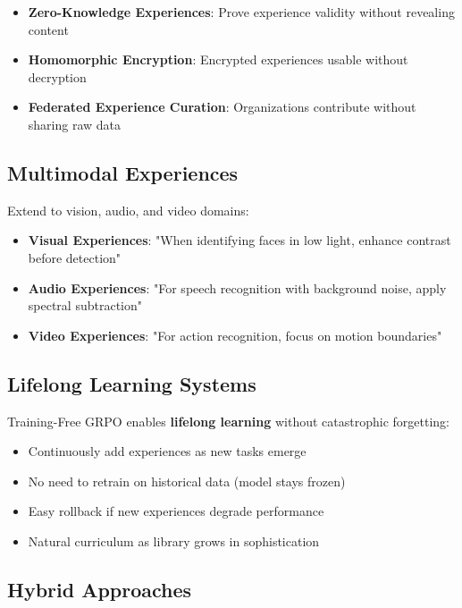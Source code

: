 \begin{itemize}
    \item \textbf{Zero-Knowledge Experiences}: Prove experience validity without revealing content
    \item \textbf{Homomorphic Encryption}: Encrypted experiences usable without decryption
    \item \textbf{Federated Experience Curation}: Organizations contribute without sharing raw data
\end{itemize}

\subsection{Multimodal Experiences}

Extend to vision, audio, and video domains:

\begin{itemize}
    \item \textbf{Visual Experiences}: "When identifying faces in low light, enhance contrast before detection"
    \item \textbf{Audio Experiences}: "For speech recognition with background noise, apply spectral subtraction"
    \item \textbf{Video Experiences}: "For action recognition, focus on motion boundaries"
\end{itemize}

\subsection{Lifelong Learning Systems}

Training-Free GRPO enables \textbf{lifelong learning} without catastrophic forgetting:

\begin{itemize}
    \item Continuously add experiences as new tasks emerge
    \item No need to retrain on historical data (model stays frozen)
    \item Easy rollback if new experiences degrade performance
    \item Natural curriculum as library grows in sophistication
\end{itemize}

\subsection{Hybrid Approaches}

